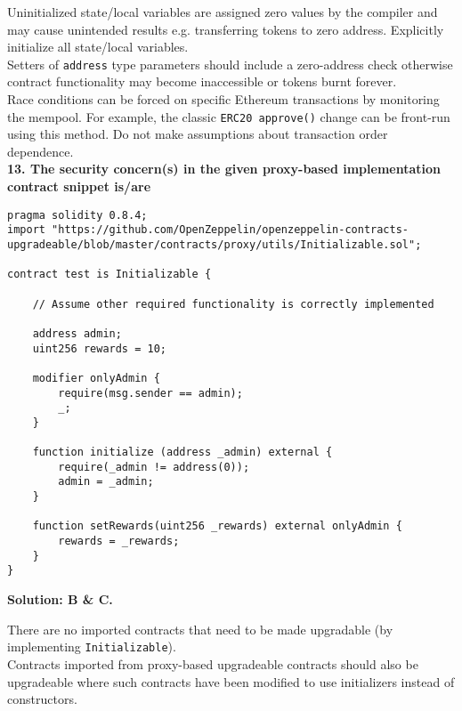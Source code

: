 Uninitialized state/local variables are assigned zero values by the compiler and may cause unintended results e.g. transferring tokens to zero address.
Explicitly initialize all state/local variables.\\

Setters of \verb|address| type parameters should include a zero-address check otherwise contract functionality may become inaccessible or tokens burnt forever.\\

Race conditions can be forced on specific Ethereum transactions by monitoring the mempool.
For example, the classic \verb|ERC20 approve()| change can be front-run using this method.
Do not make assumptions about transaction order dependence.\\

\textbf{13. The security concern(s) in the given proxy-based implementation contract snippet is/are}\label{sec:exam4_q13}\\

\begin{lstlisting}[language=Solidity, style=solStyle]
pragma solidity 0.8.4;
import "https://github.com/OpenZeppelin/openzeppelin-contracts-upgradeable/blob/master/contracts/proxy/utils/Initializable.sol";

contract test is Initializable {

    // Assume other required functionality is correctly implemented

    address admin;
    uint256 rewards = 10;

    modifier onlyAdmin {
        require(msg.sender == admin);
        _;
    }

    function initialize (address _admin) external {
        require(_admin != address(0));
        admin = _admin;
    }

    function setRewards(uint256 _rewards) external onlyAdmin {
        rewards = _rewards;
    }
}
\end{lstlisting}

\textbf{Solution: B \& C.}

There are no imported contracts that need to be made upgradable (by implementing \verb|Initializable|).\\

Contracts imported from proxy-based upgradeable contracts should also be upgradeable where such contracts have been modified to use initializers instead of constructors.\\

